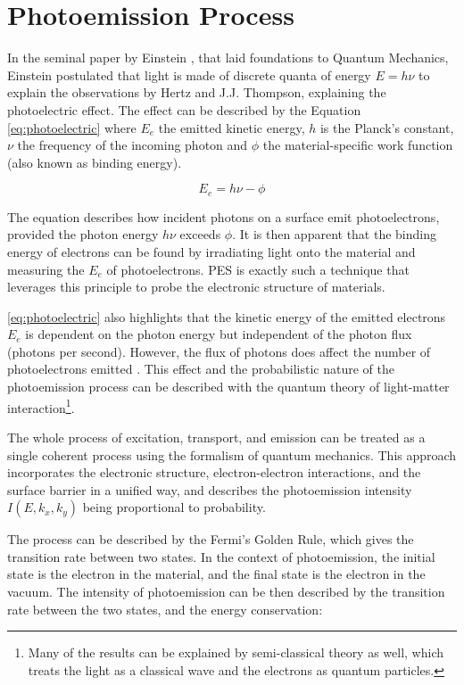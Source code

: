 \section{Photoemission Process}\label{section:photoemission-process}
In the seminal paper by Einstein \cite{einsteinUberErzeugungUnd1905}, that laid foundations to Quantum Mechanics, Einstein postulated that light is made of discrete quanta of energy $E = h\nu$ to explain the observations by Hertz and J.J. Thompson, explaining the photoelectric effect. The effect can be described by the Equation \ref{eq:photoelectric} where $E_e$ the emitted kinetic energy, $h$ is the Planck's constant, $\nu$ the frequency of the incoming photon and  $\phi$ the material-specific work function (also known as binding energy). 

\begin{equation}\label{eq:photoelectric}
    E_e = h\nu - \phi
\end{equation}

The equation describes how incident photons on a surface emit photoelectrons, provided the photon energy $h\nu$ exceeds $\phi$.
It is then apparent that the binding energy of electrons can be found by irradiating light onto the material and measuring the $E_e$ of photoelectrons. \Gls{PES} is exactly such a technique that leverages this principle to probe the electronic structure of materials.

\cref{eq:photoelectric} also highlights that the kinetic energy of the emitted electrons $E_e$ is dependent on the photon energy but independent of the photon flux (photons per second). However, the flux of photons does affect the number of photoelectrons emitted \cite{foxQuantumOpticsIntroduction2006}. This effect and the probabilistic nature of the photoemission process can be described with the quantum theory of light-matter interaction\footnote{Many of the results can be explained by semi-classical theory as well, which treats the light as a classical wave and the electrons as quantum particles.}.

The whole process of excitation, transport, and emission can be treated as a single coherent process using the formalism of quantum mechanics. This approach incorporates the electronic structure, electron-electron interactions, and the surface barrier in a unified way, and describes the photoemission intensity  $I(E, k_x, k_y)$ being proportional to probability.

The process can be described by the Fermi's Golden Rule, which gives the transition rate between two states. In the context of photoemission, the initial state is the electron in the material, and the final state is the electron in the vacuum. The intensity of photoemission can be then described by the transition rate between the two states, and the energy conservation:

